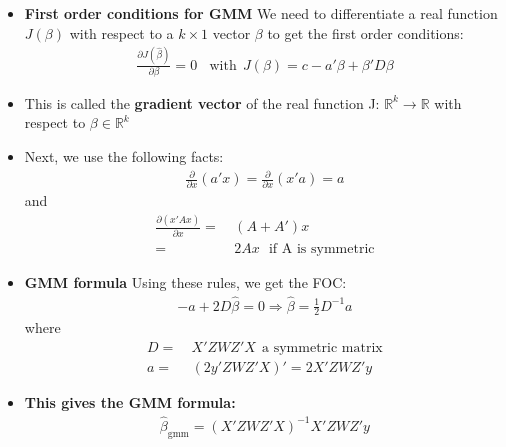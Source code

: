 \documentclass[a4paper,twoside,11pt]{article}
\begin{document}
\begin{itemize}
    \item \textbf{First order conditions for GMM}
\newline
We need to differentiate a real function $J(\beta)$ with respect to a $k \times 1$ vector $\beta$ to get the first order conditions:
\begin{equation*}
\begin{aligned}
\frac{\partial J(\hat{\beta})}{\partial \beta} = 0 \ \ \ \ \text{with} \ \ J(\beta) = c - a' \beta + \beta' D \beta
\end{aligned} 
\end{equation*}
    \item This is called the \textbf{gradient vector} of the real function J: $\mathbb{R}^k \rightarrow \mathbb{R}$ with respect to $\beta \in \mathbb{R}^k$
    \item Next, we use the following facts:
\newline
\begin{equation*}
\begin{aligned}
\frac{\partial}{\partial x} (a'x) = \frac{\partial}{\partial x}(x'a) = a 
\end{aligned} 
\end{equation*}
and 
\begin{equation*}
\begin{aligned}
\frac{\partial (x'Ax)}{\partial x} =& \ (A+A')x \\
=& \ 2Ax \ \ \ \text{if A is symmetric}
\end{aligned} 
\end{equation*}
    \item \textbf{GMM formula}
\newline
Using these rules, we get the FOC:
\begin{equation*}
\begin{aligned}
-a + 2D \hat{\beta} = 0 \Rightarrow \hat{\beta} = \frac{1}{2}D^{-1} a 
\end{aligned} 
\end{equation*}
where
\begin{equation*}
\begin{aligned}
D =& \ X'ZWZ'X \ \ \text{a symmetric matrix} \\
a =& \  (2y'ZWZ'X)' = 2X'ZWZ'y
\end{aligned} 
\end{equation*}
    \item \textbf{This gives the GMM formula:}
\begin{equation*}
\begin{aligned}
\hat{\beta}_{\text{gmm}} = (X'ZWZ'X)^{-1} X'ZWZ'y
\end{aligned} 
\end{equation*}
\end{itemize}
\end{document}
